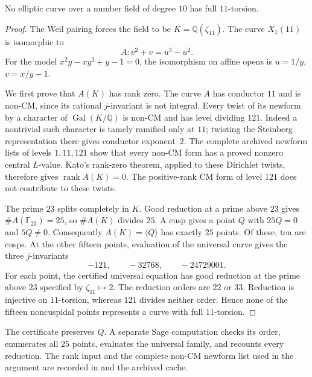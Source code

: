 \begin{proposition}\label{prop:no-full11}
No elliptic curve over a number field of degree $10$ has full
$11$-torsion.
\end{proposition}
\begin{proof}
The Weil pairing forces the field to be $K=\mathbb Q(\zeta_{11})$.
The curve $X_1(11)$ is isomorphic to
\[
 A:v^2+v=u^3-u^2.
\]
For the model $x^2y-xy^2+y-1=0$, the isomorphism on affine opens is
$u=1/y$, $v=x/y-1$.

We first prove that $A(K)$ has rank zero. The curve $A$ has conductor
$11$ and is non-CM, since its rational $j$-invariant is not integral.
Every twist of its newform by a character of
$\operatorname{Gal}(K/\mathbb Q)$ is non-CM and has level dividing $121$.
Indeed a nontrivial such character is tamely ramified only at $11$;
twisting the Steinberg representation there gives conductor exponent~$2$.
The complete archived newform lists of levels $1,11,121$ show that
every non-CM form has a proved nonzero central $L$-value.
Kato's rank-zero theorem, applied to these Dirichlet twists, therefore
gives $\operatorname{rank}A(K)=0$.
The positive-rank CM form of level $121$ does not contribute to these twists.

The prime $23$ splits completely in $K$. Good reduction at a prime
above $23$ gives $\#A(\mathbb F_{23})=25$, so $\#A(K)$ divides $25$.
A cusp gives a point $Q$ with $25Q=0$ and $5Q\ne0$.
Consequently $A(K)=\langle Q\rangle$ has exactly $25$ points.
Of these, ten are cusps. At the other fifteen points, evaluation of
the universal curve gives the three $j$-invariants
\[
 -121,\qquad-32768,\qquad-24729001.
\]
For each point, the certified universal equation has good reduction
at the prime above $23$ specified by $\zeta_{11}\mapsto2$.
The reduction orders are $22$ or $33$. Reduction is injective on
$11$-torsion, whereas $121$ divides neither order. Hence none of the
fifteen noncuspidal points represents a curve with full $11$-torsion.
\end{proof}

The certificate  preserves $Q$.
A separate Sage computation checks its order, enumerates all $25$ points,
evaluates the universal family, and recounts every reduction.
The rank input and the complete non-CM newform list used in the argument
are recorded in  and the archived cache.
